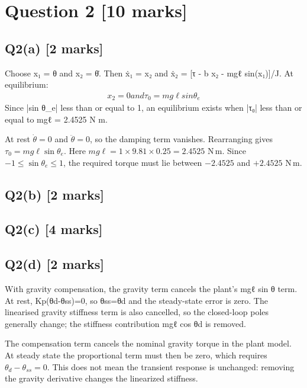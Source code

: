 \documentclass[11pt,a4paper]{article}
\begin{document}
\section*{Question 2 \hfill [10 marks]}
\subsection*{Q2(a) \hfill [2 marks]}

Choose x₁ = θ and x₂ = θ̇.
Then ẋ₁ = x₂ and ẋ₂ = [τ - b x₂ - mgℓ sin(x₁)]/J.
At equilibrium:\[\begin{aligned}x_2 = 0 and τ_0 = mg\ell sin \theta_e\end{aligned}\]
Since |sin θ\_e| less than or equal to 1, an equilibrium exists when |τ₀| less than or equal to mgℓ = 2.4525 N m.\par\smallskip At rest $\dot\theta=0$ and $\ddot\theta=0$, so the damping term vanishes. Rearranging gives $\tau_0=mg\ell\sin\theta_e$. Here $mg\ell=1\times9.81\times0.25=2.4525$ N\,m. Since $-1\leq\sin\theta_e\leq1$, the required torque must lie between $-2.4525$ and $+2.4525$ N\,m.

\subsection*{Q2(b) \hfill [2 marks]}

\vspace{2mm}

\subsection*{Q2(c) \hfill [4 marks]}

\vspace{2mm}

\subsection*{Q2(d) \hfill [2 marks]}

With gravity compensation, the gravity term cancels the plant's mgℓ sin θ term.
At rest, Kp(θd-θss)=0, so θss=θd and the steady-state error is zero.
The linearised gravity stiffness term is also cancelled, so the closed-loop poles generally change; the stiffness contribution mgℓ cos θd is removed.\par\smallskip The compensation term cancels the nominal gravity torque in the plant model. At steady state the proportional term must then be zero, which requires $\theta_d-\theta_{ss}=0$. This does not mean the transient response is unchanged: removing the gravity derivative changes the linearized stiffness.
\end{document}
